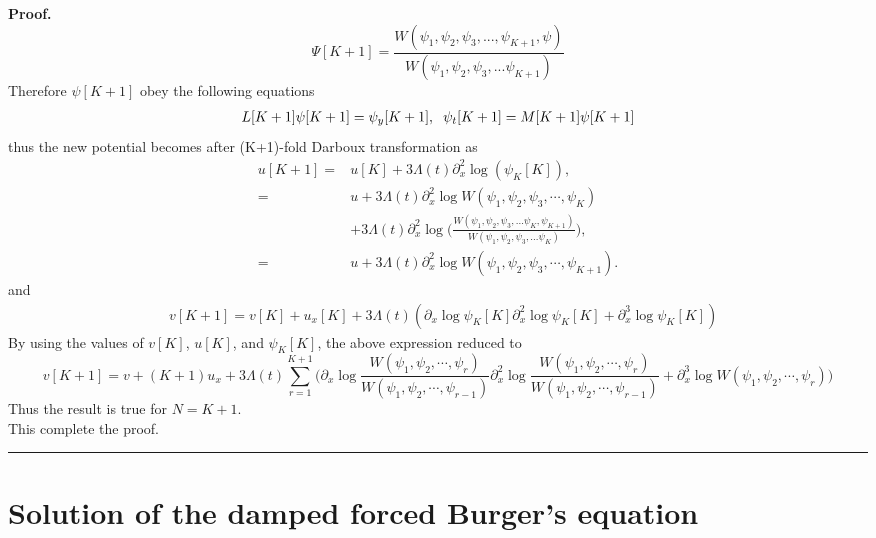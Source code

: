 \documentclass{article}%
\newenvironment{proof}[1][Proof]{\noindent\textbf{#1.} }{\ \rule{0.5em}{0.5em}}
\begin{document}
\begin{proof}
\begin{equation}
\Psi[K+1]=\frac{W(\psi_{1},\psi_{2},\psi_{3},...,\psi_{K+1},\psi)}{W(\psi_{1},\psi_{2},\psi_{3},...\psi_{K+1})} \label{MKDT}
\end{equation}
Therefore $\psi[K+1]$ obey the following equations
\begin{equation}
\begin{split}
L[K+1]\psi[K+1]=\psi_y[K+1],\hspace{2mm}\psi_t[K+1]=M[K+1]\psi[K+1] 
 \label{Mcovlaxpair}
\end{split}
\end{equation}
thus the new potential becomes after (K+1)-fold Darboux transformation as
\begin{equation}
\begin{split}
u[K+1]=&u[K]+3\Lambda(t)\partial^{2}_{x}\log (\psi_K[K]),  \\
=&u+3\Lambda(t)\partial^{2}_{x}\log W(\psi_{1},\psi_{2},\psi_{3},\cdots,\psi_{K})\\&+3\Lambda(t)\partial^{2}_{x}\log\bigg(\frac{W(\psi_{1},\psi_{2},\psi_{3},...\psi_{K},\psi_{K+1})}{W(\psi_{1},\psi_{2},\psi_{3},...\psi_{K})}\bigg),\\
=&u+3\Lambda(t)\partial^{2}_{x}\log W(\psi_{1},\psi_{2},\psi_{3},\cdots,\psi_{K+1}).
\end{split}                                             \label{Knewsol}
\end{equation}
and 
\begin{equation}
\begin{split}
&v[K+1]=v[K]+u_x[K]+ 3\Lambda(t)(\partial_x\log \psi_K[K]\partial^{2}_x\log \psi_K[K]+\partial^{3}_x\log \psi_K[K])
\end{split}
\end{equation}
By using the values of $v[K]$, $u[K]$, and $\psi_K[K]$, the above expression reduced to 
\begin{equation}
v[K+1]=v+(K+1)u_x+3\Lambda(t)\sum_{r=1}^{K+1}\bigg(\partial_x\log \frac{W(\psi_1,\psi_2,\cdots,\psi_r)}{W(\psi_1,\psi_2,\cdots,\psi_{r-1})}\partial^{2}_x\log\frac{W(\psi_1,\psi_2,\cdots,\psi_r)}{W(\psi_1,\psi_2,\cdots,\psi_{r-1})}+\partial^{3}_x\log W(\psi_1,\psi_2,\cdots,\psi_r)\bigg)
\end{equation}
Thus the result is true for $N=K+1$.\\
This complete the proof.
\end{proof}
\section{Solution of the damped forced Burger's equation}
\end{document}
